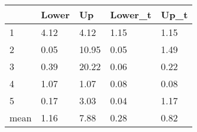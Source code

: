 \begin{tabular}{lllll}
& Lower & Up & Lower_t & Up_t \\ 
\hline 
1 & 4.12 & 4.12 & 1.15 & 1.15 \\ 
2 & 0.05 & 10.95 & 0.05 & 1.49 \\ 
3 & 0.39 & 20.22 & 0.06 & 0.22 \\ 
4 & 1.07 & 1.07 & 0.08 & 0.08 \\ 
5 & 0.17 & 3.03 & 0.04 & 1.17 \\ 
mean & 1.16 & 7.88 & 0.28 & 0.82 \\ 
\hline 
\end{tabular}